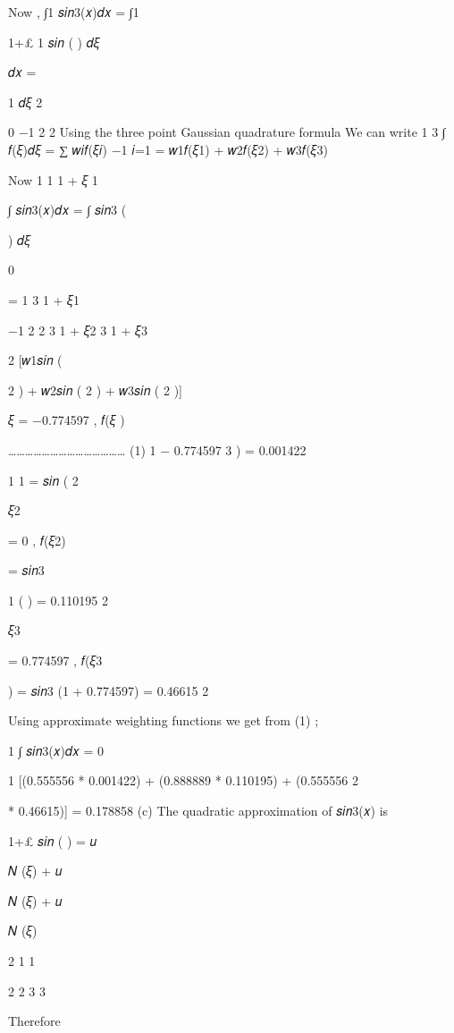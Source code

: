 {{{{{{Now ,
∫1 𝑠𝑖𝑛3(𝑥)𝑑𝑥 = ∫1
 






1+£  1
𝑠𝑖𝑛 (	)   𝑑𝜉
 
𝑑𝑥 =
 
1 𝑑𝜉
2
 
0	−1	2	2
Using the three point Gaussian quadrature formula We can write
1	3
∫ 𝑓(𝜉)𝑑𝜉 = ∑ 𝑤𝑖𝑓(𝜉𝑖)
−1	𝑖=1
= 𝑤1𝑓(𝜉1) + 𝑤2𝑓(𝜉2) + 𝑤3𝑓(𝜉3)
 
Now
1	1	1 + 𝜉  1
 
∫ 𝑠𝑖𝑛3(𝑥)𝑑𝑥 = ∫  𝑠𝑖𝑛3 (
 
)   𝑑𝜉
 
0

= 1	3  1 + 𝜉1
 
−1	2	2
3  1 + 𝜉2	3  1 + 𝜉3
 
2 [𝑤1𝑠𝑖𝑛 (
 
2	) + 𝑤2𝑠𝑖𝑛 (	2	) + 𝑤3𝑠𝑖𝑛 (	2	)]
 

 


𝜉 = −0.774597 ,	𝑓(𝜉 )
 
…………………………………… (1)
1 − 0.774597
3	) = 0.001422
 
1	1  = 𝑠𝑖𝑛 (	2


 
𝜉2
 
= 0 , 𝑓(𝜉2)
 
= 𝑠𝑖𝑛3
 
1
( ) = 0.110195 2
 

 
𝜉3
 
= 0.774597 ,	𝑓(𝜉3
 
) = 𝑠𝑖𝑛3 (1 + 0.774597) = 0.46615
2
 
Using approximate weighting functions we get from (1) ;

 
1
∫ 𝑠𝑖𝑛3(𝑥)𝑑𝑥 =
0
 
1
  [(0.555556 * 0.001422) + (0.888889 * 0.110195) + (0.555556
2
 
* 0.46615)]
= 0.178858
(c)
The quadratic approximation of 𝑠𝑖𝑛3(𝑥) is

 
1+£
𝑠𝑖𝑛 (	) = 𝑢
 
𝑁 (𝜉) + 𝑢
 
𝑁 (𝜉) + 𝑢
 
𝑁 (𝜉)
 
2	1  1
 
2  2	3  3
 

 




Therefore
 
}}}}}}
